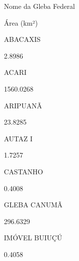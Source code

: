 \documentclass[
  letterpaper,
]{report}
\begin{document}
\n  

\n    

\n      

Nome da Gleba Federal

\n      

Área (km²)

\n    

\n  

\n  

\n    

\n      

ABACAXIS

\n      

2.8986

\n    

\n    

\n      

ACARI

\n      

1560.0268

\n    

\n    

\n      

ARIPUANÃ

\n      

23.8285

\n    

\n    

\n      

AUTAZ I

\n      

1.7257

\n    

\n    

\n      

CASTANHO

\n      

0.4008

\n    

\n    

\n      

GLEBA CANUMÃ

\n      

296.6329

\n    

\n    

\n      

IMÓVEL BUIUÇÚ

\n      

0.4058

\n    

\n    

\n      
\end{document}
